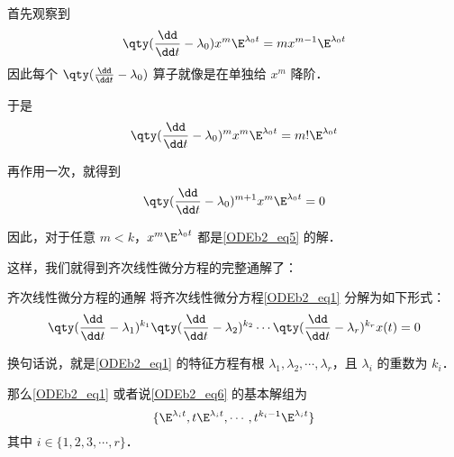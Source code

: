 首先观察到
\begin{equation}
\qty(\frac{\dd}{\dd t}-\lambda_0)x^m\E^{\lambda_0 t}=mx^{m-1}\E^{\lambda_0 t}
\end{equation}
因此每个 $\qty(\frac{\dd}{\dd t}-\lambda_0)$ 算子就像是在单独给 $x^m$ 降阶．

于是
\begin{equation}
\qty(\frac{\dd}{\dd t}-\lambda_0)^mx^m\E^{\lambda_0 t}=m!\E^{\lambda_0 t}
\end{equation}

再作用一次，就得到
\begin{equation}
\qty(\frac{\dd}{\dd t}-\lambda_0)^{m+1}x^m\E^{\lambda_0 t}=0
\end{equation}

因此，对于任意 $m<k$，$x^m\E^{\lambda_0 t}$ 都是\autoref{ODEb2_eq5} 的解．

这样，我们就得到齐次线性微分方程的完整通解了：

\begin{theorem}{齐次线性微分方程的通解}
将齐次线性微分方程\autoref{ODEb2_eq1} 分解为如下形式：
\begin{equation}\label{ODEb2_eq6}
\qty(\frac{\dd}{\dd t}-\lambda_1)^{k_1}\qty(\frac{\dd}{\dd t}-\lambda_2)^{k_2}\cdots\qty(\frac{\dd}{\dd t}-\lambda_r)^{k_r}x(t)=0
\end{equation}

换句话说，就是\autoref{ODEb2_eq1} 的特征方程有根 $\lambda_1, \lambda_2, \cdots, \lambda_r$，且 $\lambda_i$ 的重数为 $k_i$．

那么\autoref{ODEb2_eq1} 或者说\autoref{ODEb2_eq6} 的基本解组为
\begin{equation}
\{
    \E^{\lambda_i t}, t\E^{\lambda_i t}, \cdots, t^{k_i-1}\E^{\lambda_i t}
\}
\end{equation}
其中 $i\in\{1, 2, 3, \cdots, r\}$．



\end{theorem}









